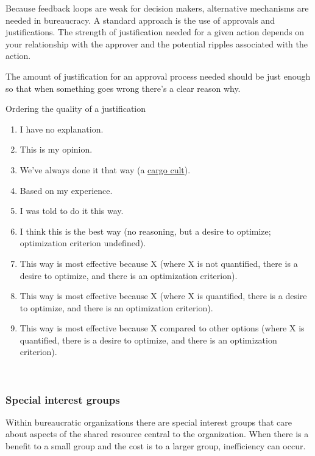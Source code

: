 Because feedback loops are weak for decision makers, alternative mechanisms are needed in bureaucracy. A standard approach is the use of approvals and justifications. The strength of justification needed for a given action depends on your relationship with the approver and the potential ripples associated with the action. 

The amount of justification for an approval process needed should be just enough so that when something goes wrong there's a clear reason why. 

Ordering the quality of a justification
\begin{enumerate}
    \item I have no explanation.
    \item This is my opinion.
    \item We've always done it that way (a \href{https://en.wikipedia.org/wiki/Cargo_cult}{cargo cult}).
    \item Based on my experience.
    \item I was told to do it this way.
    \item I think this is the best way (no reasoning, but a desire to optimize; optimization criterion undefined).
    \item This way is most effective because X (where X is not quantified, there is a desire to optimize, and there is an optimization criterion).
    \item This way is most effective because X (where X is quantified, there is a desire to optimize, and there is an optimization criterion).
    \item This way is most effective because X compared to other options (where X is quantified, there is a desire to optimize, and there is an optimization criterion).
\end{enumerate}


\ \\



\subsubsection*{Special interest groups}

Within bureaucratic organizations there are special interest groups that care about aspects of the shared resource central to the organization. 
When there is a benefit to a small group and the cost is to a larger group, inefficiency can occur.

